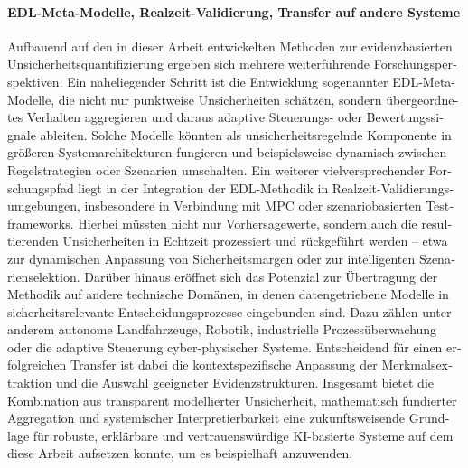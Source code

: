 \begin{otherlanguage}{ngerman}
\paragraph{EDL-Meta-Modelle, Realzeit-Validierung, Transfer auf andere Systeme} Aufbauend auf den in dieser Arbeit entwickelten Methoden zur evidenzbasierten Unsicherheitsquantifizierung ergeben sich mehrere weiterführende Forschungsperspektiven. Ein naheliegender Schritt ist die Entwicklung sogenannter EDL-Meta-Modelle, die nicht nur punktweise Unsicherheiten schätzen, sondern übergeordnetes Verhalten aggregieren und daraus adaptive Steuerungs- oder Bewertungssignale ableiten. Solche Modelle könnten als unsicherheitsregelnde Komponente in größeren Systemarchitekturen fungieren und beispielsweise dynamisch zwischen Regelstrategien oder Szenarien umschalten.
Ein weiterer vielversprechender Forschungspfad liegt in der Integration der EDL-Methodik in Realzeit-Validierungsumgebungen, insbesondere in Verbindung mit MPC oder szenariobasierten Testframeworks. Hierbei müssten nicht nur Vorhersagewerte, sondern auch die resultierenden Unsicherheiten in Echtzeit prozessiert und rückgeführt werden – etwa zur dynamischen Anpassung von Sicherheitsmargen oder zur intelligenten Szenarienselektion.
Darüber hinaus eröffnet sich das Potenzial zur Übertragung der Methodik auf andere technische Domänen, in denen datengetriebene Modelle in sicherheitsrelevante Entscheidungsprozesse eingebunden sind. Dazu zählen unter anderem autonome Landfahrzeuge, Robotik, industrielle Prozessüberwachung oder die adaptive Steuerung cyber-physischer Systeme. Entscheidend für einen erfolgreichen Transfer ist dabei die kontextspezifische Anpassung der Merkmalsextraktion und die Auswahl geeigneter Evidenzstrukturen.
Insgesamt bietet die Kombination aus transparent modellierter Unsicherheit, mathematisch fundierter Aggregation und systemischer Interpretierbarkeit eine zukunftsweisende Grundlage für robuste, erklärbare und vertrauenswürdige KI-basierte Systeme auf dem diese Arbeit aufsetzen konnte, um es beispielhaft anzuwenden.




\end{otherlanguage}